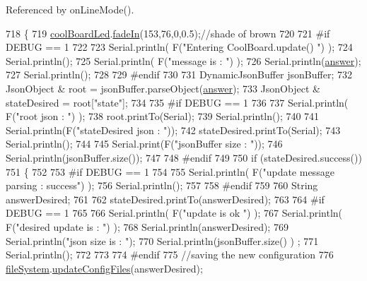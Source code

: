 Referenced by on\+Line\+Mode().


\begin{DoxyCode}
718 \{
719     \hyperlink{classCoolBoard_a1b1d3c684a5baa56b08486e192fd8e97}{coolBoardLed}.\hyperlink{classCoolBoardLed_ab778f5e7bed0ab74e3906d82110493c3}{fadeIn}(153,76,0,0.5);\textcolor{comment}{//shade of brown        }
720 
721 \textcolor{preprocessor}{#if DEBUG == 1}
722 
723     Serial.println( F(\textcolor{stringliteral}{"Entering CoolBoard.update() "}) );
724     Serial.println();
725     Serial.println( F(\textcolor{stringliteral}{"message is : "}) );
726     Serial.println(\hyperlink{classCoolBoard_a7b835fafd449e5282f7f91d787a2dc15}{answer});
727     Serial.println();
728 
729 \textcolor{preprocessor}{#endif}
730 
731     DynamicJsonBuffer jsonBuffer;
732     JsonObject & root = jsonBuffer.parseObject(\hyperlink{classCoolBoard_a7b835fafd449e5282f7f91d787a2dc15}{answer});
733     JsonObject & stateDesired = root[\textcolor{stringliteral}{"state"}];
734 
735 \textcolor{preprocessor}{#if DEBUG == 1}
736 
737     Serial.println( F(\textcolor{stringliteral}{"root json : "}) );
738     root.printTo(Serial);
739     Serial.println();
740 
741     Serial.println(F(\textcolor{stringliteral}{"stateDesired json : "}));
742     stateDesired.printTo(Serial);
743     Serial.println();
744     
745     Serial.print(F(\textcolor{stringliteral}{"jsonBuffer size : "}));
746     Serial.println(jsonBuffer.size());
747 
748 \textcolor{preprocessor}{#endif}
749 
750     \textcolor{keywordflow}{if} (stateDesired.success())
751     \{
752     
753 \textcolor{preprocessor}{    #if DEBUG == 1}
754 
755         Serial.println( F(\textcolor{stringliteral}{"update message parsing : success"}) );
756         Serial.println();
757     
758 \textcolor{preprocessor}{    #endif}
759 
760             String answerDesired;
761         
762             stateDesired.printTo(answerDesired);
763             
764 \textcolor{preprocessor}{        #if DEBUG == 1      }
765         
766             Serial.println( F(\textcolor{stringliteral}{"update is ok "}) );
767             Serial.println( F(\textcolor{stringliteral}{"desired update is : "}) );            
768             Serial.println(answerDesired);
769             Serial.println(\textcolor{stringliteral}{"json size is : "});
770             Serial.println(jsonBuffer.size() ) ;                
771             Serial.println();
772 
773         
774 \textcolor{preprocessor}{        #endif}
775             \textcolor{comment}{//saving the new configuration}
776             \hyperlink{classCoolBoard_a42c2586fbb13ff7f06538e9284e8538d}{fileSystem}.\hyperlink{classCoolFileSystem_adfa8e2e80641ae6f0cceabd348a9b841}{updateConfigFiles}(answerDesired);

\end{DoxyCode}

